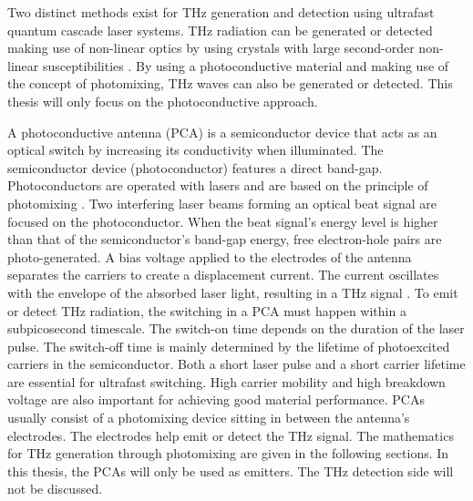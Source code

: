 Two distinct methods exist for THz generation and detection using ultrafast quantum cascade laser systems. THz radiation can be generated or detected making use of non-linear optics by using crystals with large second-order non-linear susceptibilities \cite{THzSourcesDetectors, kimHighlyNonlinearOptical2021}. By using a photoconductive material and making use of the concept of photomixing, THz waves can also be generated or detected. This thesis will only focus on the photoconductive approach. 


A photoconductive antenna (PCA) is a semiconductor device that acts as an optical switch by increasing its conductivity when illuminated. The semiconductor device (photoconductor) features a direct band-gap. Photoconductors are operated with lasers and are based on the principle of photomixing \cite{peytavitTHzPhotomixers2021}. Two interfering laser beams forming an optical beat signal are focused on the photoconductor. When the beat signal's energy level is higher than that of the semiconductor's band-gap energy, free electron-hole pairs are photo-generated. A bias voltage applied to the electrodes of the antenna separates the carriers to create a displacement current. The current oscillates with the envelope of the absorbed laser light, resulting in a THz signal \cite{nandiErAsInAlGaAsPhotoconductors2021}. To emit or detect THz radiation, the switching in a PCA must happen within a subpicosecond timescale. The switch-on time depends on the duration of the laser pulse. The switch-off time is mainly determined by the lifetime of photoexcited carriers in the semiconductor. Both a short laser pulse and a short carrier lifetime are essential for ultrafast switching. High carrier mobility and high breakdown voltage are also important for achieving good material performance. PCAs usually consist of a photomixing device sitting in between the antenna's electrodes. The electrodes help emit or detect the THz signal. The mathematics for THz generation through photomixing are given in the following sections. In this thesis, the PCAs will only be used as emitters. The THz detection side will not be discussed.




